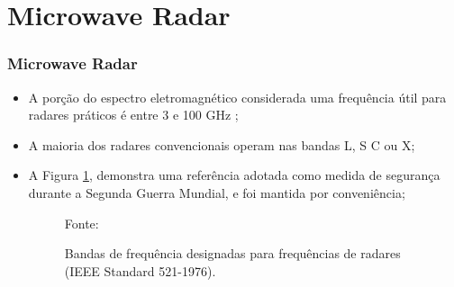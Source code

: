 \documentclass[xcolor=dvipsnames, aspectratio=169]{beamer}
\begin{document}
\section[Microwave Radar]{Microwave Radar} 
\begin{frame}
\frametitle{Microwave Radar}
	\begin{itemize}
		\item A porção do espectro eletromagnético considerada uma frequência útil para radares práticos é entre 3 e 100 GHz \cite{everett1995sensors};
		\item A maioria dos radares convencionais operam nas bandas L, S C ou X;
		\item A Figura \ref{fig:curva_de_freq}, demonstra uma referência adotada como medida de segurança durante a Segunda Guerra Mundial, e foi mantida por conveniência;
		
		\begin{figure}
            \centering
            {Fonte: \cite{everett1995sensors}}
            \caption{Bandas de frequência designadas para frequências de radares (IEEE Standard 521-1976).}
            \label{fig:curva_de_freq}
        \end{figure}


\end{itemize}
\end{frame}
\end{document}
